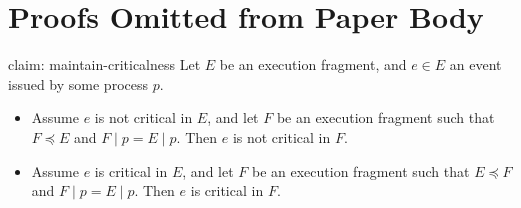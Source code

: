 
\section{Proofs Omitted from Paper Body}

\begin{claim-repeat} {claim: maintain-criticalness}
		Let $E$ be an execution fragment, and $e \in E$ an event issued by some process $p$.
		\begin{itemize}[$\bullet$]
			\item Assume $e$ is not critical in $E$, and let $F$ be an execution fragment such that $F \preceq E$ and $F \mid p = E \mid p$. Then $e$ is not critical in $F$.
			\item Assume $e$ is critical in $E$, and let $F$ be an execution fragment such that $E \preceq F$ and $F \mid p = E \mid p$. Then $e$ is critical in $F$.
		\end{itemize}
\end{claim-repeat}


